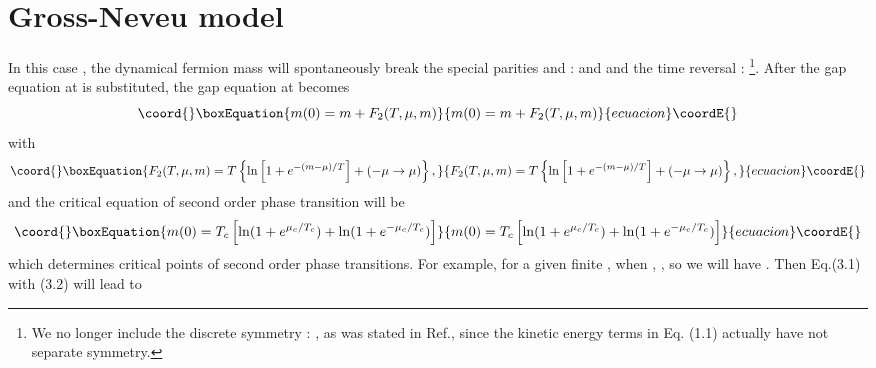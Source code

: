 \documentclass[a4paper,eqsecnum]{revtex4}
\begin{document}
\section{\coordHE{} Gross-Neveu model\label{sec:3D}}
\indent  In this case \cite{kn:16}, the dynamical fermion 
mass will spontaneously break the special parities \coordHE{} and \coordHE{}: 
\coordHE{}  \coordHE{} and \coordHE{} and the time reversal \coordHE{}: 
\coordHE{}\footnote{We no longer include the discrete symmetry \coordHE{}: \coordHE{}, as was stated in 
Ref.\cite{kn:16}, since the kinetic energy terms in Eq. (1.1) actually have not 
separate \myHighlight{$Z_2$}\coordHE{} symmetry.}. After the gap equation at \coordHE{} is substituted,
the gap equation at \myHighlight{$T\neq 0$}\coordHE{} becomes 
\begin{equation}\coord{}\boxEquation{
m(0)=m+F_2(T,\mu,m)
}{
m(0)=m+F_2(T,\mu,m)
}{ecuacion}\coordE{}\end{equation}%
with
\begin{equation}\coord{}\boxEquation{
F_2(T,\mu,m)= T\left\{\ln \left[1+e^{-(m-\mu)/T}\right]+
                  (-\mu\to \mu)\right\},
}{
F_2(T,\mu,m)= T\left\{\ln \left[1+e^{-(m-\mu)/T}\right]+
                  (-\mu\to \mu)\right\},
}{ecuacion}\coordE{}\end{equation}%
and the critical equation of second order phase transition will be
\begin{equation}\coord{}\boxEquation{
m(0)= T_c\left[\ln (1+e^{\mu_c/T_c})+
                  \ln (1+e^{-\mu_c/T_c})\right]
}{
m(0)= T_c\left[\ln (1+e^{\mu_c/T_c})+
                  \ln (1+e^{-\mu_c/T_c})\right]
}{ecuacion}\coordE{}\end{equation}%
which determines critical points of second order phase transitions.  For example, for a given finite \coordHE{}, when \coordHE{}, \coordHE{}, so we will 
have \myHighlight{$m/T \ll 1$}\coordHE{}.  Then  Eq.(3.1) with (3.2) will lead to 
\end{document}
